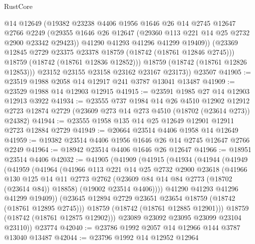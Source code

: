 \begin{lexlean}{RustCore}
\begin{coremodule}
              @14
              @12649
              (@19382
                @23238
                @4406
                @1956
                @1646
                @26
                @14
                @2745
                @12647
                @2766
                @2249
                (@29355 @1646 @26 @12647 (@29360 @113 @221 @14 @25 @2732 @2900 @23342 @29423))
                @41290
                @41293
                @41296
                @41299
                @19409))
            (@23369 @12845 @2729 @23375 @23378 @18759 (@18742 (@18761 @12846 @2745)))
            @18759
            (@18742 (@18761 @12836 @12852)))
          @18759
          (@18742 (@18761 @12826 @12853)))
        @23152
        @23155
        @23158
        @23162
        @23167
        @23173))
    @23507
@41905 := @23519 @1988 @2058 @14 @12917 @241 @3787 @13041 @13487
@41909 := @23529 @1988 @14 @12903 @12915
@41915 := @23591 @1985 @27 @14 @12903 @12913 @3922
@41934 := @23555
    @737
    @1984
    @14
    @26
    @4510
    @12902
    @12912
    @2723
    @12874
    @2729
    (@23609 @273 @14 @273 @4510 (@18702 (@23614 @273)) @24382)
@41944 := @23555 @1958 @135 @14 @25 @12649 @12901 @12911 @2723 @12884 @2729
@41949 := @20664 @23514 @4406 @1958 @14 @12649
@41959 := @19382 @23514 @4406 @1956 @1646 @26 @14 @2745 @12647 @2766 @2249
@41964 := @18942 @23514 @4406 @1646 @26 @12647
@41966 := @18951 @23514 @4406
@42032 := @41905
    (@41909
      (@41915
        (@41934
          (@41944
            (@41949
              (@41959
                (@41964
                  (@41966
                    @113
                    @221
                    @14
                    @25
                    @2732
                    @2900
                    @23618
                    (@41966
                      @130
                      @125
                      @14
                      @11
                      @2773
                      @2762
                      (@23609 @84 @14 @84 @2773 (@18702 (@23614 @84)) @18858)
                      (@19002 @23514 @4406))))
                @41290
                @41293
                @41296
                @41299
                @19409))
            (@23645 @12894 @2729 @23651 @23654 @18759 (@18742 (@18761 @12895 @2745)))
            @18759
            (@18742 (@18761 @12885 @12901)))
          @18759
          (@18742 (@18761 @12875 @12902)))
        @23089
        @23092
        @23095
        @23099
        @23104
        @23110))
    @23774
@42040 := @23786 @1992 @2057 @14 @12966 @144 @3787 @13040 @13487
@42044 := @23796 @1992 @14 @12952 @12964

\end{coremodule}
\end{lexlean}
